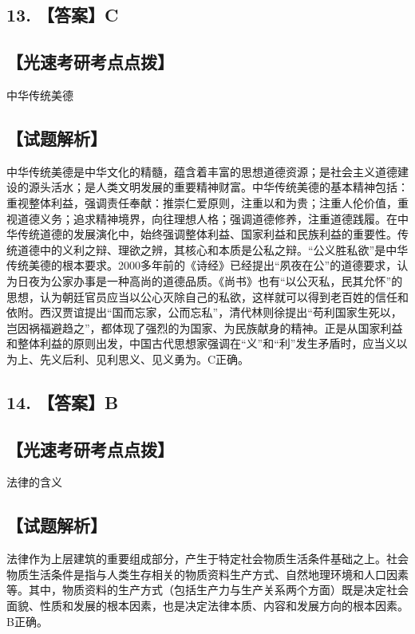 \documentclass[UTF8,11pt]{ctexart}
\begin{document}
\subsection*{13. 【答案】C}

\subsection*{【光速考研考点点拨】}

中华传统美德


\subsection*{【试题解析】}

中华传统美德是中华文化的精髓，蕴含着丰富的思想道德资源；是社会主义道德建设的源头活水；是人类文明发展的重要精神财富。中华传统美德的基本精神包括：重视整体利益，强调责任奉献：推崇仁爱原则，注重以和为贵；注重人伦价值，重视道德义务；追求精神境界，向往理想人格；强调道德修养，注重道德践履。在中华传统道德的发展演化中，始终强调整体利益、国家利益和民族利益的重要性。传统道德中的义利之辩、理欲之辨，其核心和本质是公私之辩。“公义胜私欲”是中华传统美德的根本要求。2000多年前的《诗经》已经提出“夙夜在公”的道德要求，认为日夜为公家办事是一种高尚的道德品质。《尚书》也有“以公灭私，民其允怀”的思想，认为朝廷官员应当以公心灭除自己的私欲，这样就可以得到老百姓的信任和依附。西汉贾谊提出“国而忘家，公而忘私”，清代林则徐提出“苟利国家生死以，岂因祸福避趋之”，都体现了强烈的为国家、为民族献身的精神。正是从国家利益和整体利益的原则出发，中国古代思想家强调在“义”和“利”发生矛盾时，应当义以为上、先义后利、见利思义、见义勇为。C正确。


\subsection*{14. 【答案】B}

\subsection*{【光速考研考点点拨】}

法律的含义


\subsection*{【试题解析】}

法律作为上层建筑的重要组成部分，产生于特定社会物质生活条件基础之上。社会物质生活条件是指与人类生存相关的物质资料生产方式、自然地理环境和人口因素等。其中，物质资料的生产方式（包括生产力与生产关系两个方面）既是决定社会面貌、性质和发展的根本因素，也是决定法律本质、内容和发展方向的根本因素。B正确。
\end{document}
